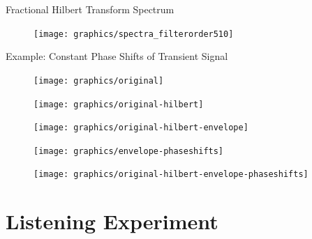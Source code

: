 \documentclass[mathserif]{intbeamer}
\begin{document}
%
%
%
\begin{frame}{Fractional Hilbert Transform Spectrum}
\begin{figure}
\texttt{[image: graphics/spectra\_filterorder510]}
\end{figure}
\end{frame}
%
%
%
\begin{frame}{Example: Constant Phase Shifts of Transient Signal}
{
\begin{figure}
\texttt{[image: graphics/original]}
\end{figure}
}
{
\begin{figure}
\texttt{[image: graphics/original-hilbert]}
\end{figure}
}
{
\begin{figure}
\texttt{[image: graphics/original-hilbert-envelope]}
\end{figure}
}
{
\begin{figure}
\texttt{[image: graphics/envelope-phaseshifts]}
\end{figure}
}
{
\begin{figure}
\texttt{[image: graphics/original-hilbert-envelope-phaseshifts]}
\end{figure}
}
\end{frame}

%
%
%

%
%
%

%
%
%

%
%
%
%
%
%
\section{Listening Experiment}
\end{document}
